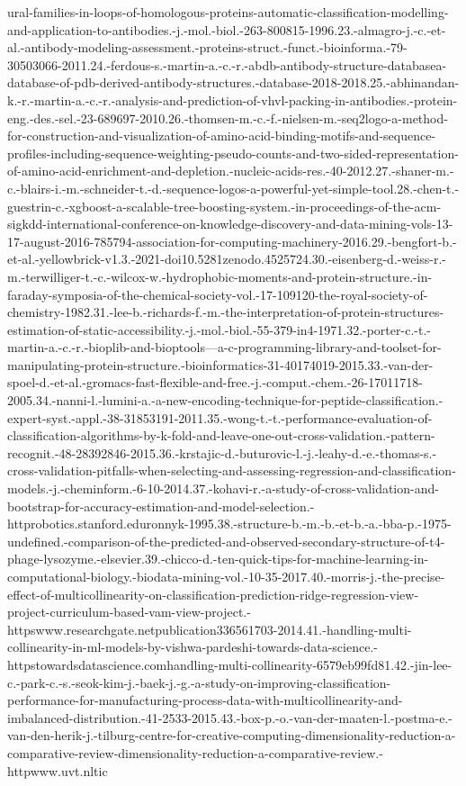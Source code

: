 \documentclass[
]{article}
\begin{document}
ural-families-in-loops-of-homologous-proteins-automatic-classification-modelling-and-application-to-antibodies.-j.-mol.-biol.-263-800815-1996.23.-almagro-j.-c.-et-al.-antibody-modeling-assessment.-proteins-struct.-funct.-bioinforma.-79-30503066-2011.24.-ferdous-s.-martin-a.-c.-r.-abdb-antibody-structure-databasea-database-of-pdb-derived-antibody-structures.-database-2018-2018.25.-abhinandan-k.-r.-martin-a.-c.-r.-analysis-and-prediction-of-vhvl-packing-in-antibodies.-protein-eng.-des.-sel.-23-689697-2010.26.-thomsen-m.-c.-f.-nielsen-m.-seq2logo-a-method-for-construction-and-visualization-of-amino-acid-binding-motifs-and-sequence-profiles-including-sequence-weighting-pseudo-counts-and-two-sided-representation-of-amino-acid-enrichment-and-depletion.-nucleic-acids-res.-40-2012.27.-shaner-m.-c.-blairs-i.-m.-schneider-t.-d.-sequence-logos-a-powerful-yet-simple-tool.28.-chen-t.-guestrin-c.-xgboost-a-scalable-tree-boosting-system.-in-proceedings-of-the-acm-sigkdd-international-conference-on-knowledge-discovery-and-data-mining-vols-13-17-august-2016-785794-association-for-computing-machinery-2016.29.-bengfort-b.-et-al.-yellowbrick-v1.3.-2021-doi10.5281zenodo.4525724.30.-eisenberg-d.-weiss-r.-m.-terwilliger-t.-c.-wilcox-w.-hydrophobic-moments-and-protein-structure.-in-faraday-symposia-of-the-chemical-society-vol.-17-109120-the-royal-society-of-chemistry-1982.31.-lee-b.-richards-f.-m.-the-interpretation-of-protein-structures-estimation-of-static-accessibility.-j.-mol.-biol.-55-379-in4-1971.32.-porter-c.-t.-martin-a.-c.-r.-bioplib-and-bioptools---a-c-programming-library-and-toolset-for-manipulating-protein-structure.-bioinformatics-31-40174019-2015.33.-van-der-spoel-d.-et-al.-gromacs-fast-flexible-and-free.-j.-comput.-chem.-26-17011718-2005.34.-nanni-l.-lumini-a.-a-new-encoding-technique-for-peptide-classification.-expert-syst.-appl.-38-31853191-2011.35.-wong-t.-t.-performance-evaluation-of-classification-algorithms-by-k-fold-and-leave-one-out-cross-validation.-pattern-recognit.-48-28392846-2015.36.-krstajic-d.-buturovic-l.-j.-leahy-d.-e.-thomas-s.-cross-validation-pitfalls-when-selecting-and-assessing-regression-and-classification-models.-j.-cheminform.-6-10-2014.37.-kohavi-r.-a-study-of-cross-validation-and-bootstrap-for-accuracy-estimation-and-model-selection.-httprobotics.stanford.eduronnyk-1995.38.-structure-b.-m.-b.-et-b.-a.-bba-p.-1975-undefined.-comparison-of-the-predicted-and-observed-secondary-structure-of-t4-phage-lysozyme.-elsevier.39.-chicco-d.-ten-quick-tips-for-machine-learning-in-computational-biology.-biodata-mining-vol.-10-35-2017.40.-morris-j.-the-precise-effect-of-multicollinearity-on-classification-prediction-ridge-regression-view-project-curriculum-based-vam-view-project.-httpswww.researchgate.netpublication336561703-2014.41.-handling-multi-collinearity-in-ml-models-by-vishwa-pardeshi-towards-data-science.-httpstowardsdatascience.comhandling-multi-collinearity-6579eb99fd81.42.-jin-lee-c.-park-c.-s.-seok-kim-j.-baek-j.-g.-a-study-on-improving-classification-performance-for-manufacturing-process-data-with-multicollinearity-and-imbalanced-distribution.-41-2533-2015.43.-box-p.-o.-van-der-maaten-l.-postma-e.-van-den-herik-j.-tilburg-centre-for-creative-computing-dimensionality-reduction-a-comparative-review-dimensionality-reduction-a-comparative-review.-httpwww.uvt.nltic
\end{document}
